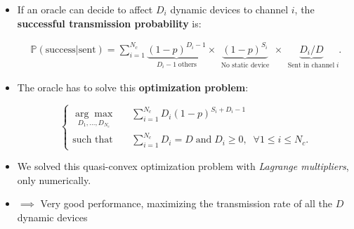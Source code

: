 \begin{frameO}

    \begin{itemize}\tightlist
        \item
              If an oracle can decide to affect \(D_i\) dynamic devices to channel
              \(i\), the \textbf{successful transmission probability} is:
              \vspace*{-10pt}

              \begin{small} \begin{align*}
                      \mathbb{P}(\text{success}|\text{sent}) = \sum_{i=1}^{N_c} \underbrace{(1 - p)^{D_i - 1}}_{\;\;D_i - 1 \;\text{others}\;\;} \times \underbrace{(1 - p)^{S_i}}_{\;\;\text{No static device}\;\;} \times \underbrace{ D_i / D }_{\;\;\text{Sent in channel}\; i}.
                  \end{align*} \end{small}
        \item
              The oracle has to solve this \textbf{optimization problem}:
              \vspace*{-5pt}

              \begin{small} \begin{equation*} \begin{cases}
                          \underset{D_1,\dots,D_{N_c}}{\arg\max}\;\;\; & \sum_{i=1}^{N_c} D_i (1 - p)^{S_i + D_i -1}                                             \\
                          \text{such that}\;\;\;                       & \sum_{i=1}^{N_c} D_i = D \; \text{and} \; D_i \geq 0, \; \; \forall 1 \leq i \leq N_c .
                      \end{cases} \end{equation*} \end{small}
        \item
              We solved this quasi-convex optimization problem with \emph{Lagrange
                  multipliers}, only numerically.
        \item
              \(\implies\) Very good performance, maximizing the transmission rate
              of all the \(D\) dynamic devices
    \end{itemize}

\end{frameO}

